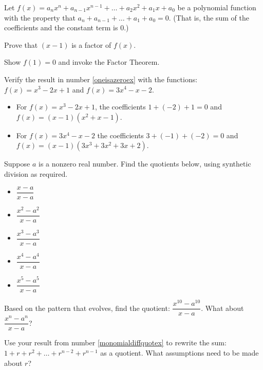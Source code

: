 \documentclass{ximera}
\begin{document}
\begin{problem}\label{oneisazeroex}
Let $f(x) = a_{n} x^{n} + a_{n-1} x^{n-1} + \ldots + a_{2} x^{2} + a_{1} x + a_{0}$ be a polynomial function with the property that $ a_{n}+a_{n-1} + \ldots + a_{1} + a_{0} = 0$.  (That is, the sum of the coefficients and the constant term is $0$.)  

Prove that $(x-1)$ is a factor of $f(x)$.

\begin{hint}
Show $f(1) = 0$ and invoke the Factor Theorem.
\end{hint}
\end{problem}

\begin{problem}
Verify the result in number \ref{oneisazeroex} with the functions: $f(x) = x^3 - 2x + 1$ and  $f(x) = 3x^4-x-2$.

\begin{solution}
\begin{itemize}

\item For $f(x) = x^3 - 2x + 1$, the coefficients $1+(-2) + 1 = 0$ and $f(x) = (x-1)(x^2+x-1)$.

\item  For $f(x) = 3x^4-x-2$ the coefficients $3+(-1)+(-2) = 0$ and $f(x) = (x-1)(3x^3+3x^2+3x+2)$.

\end{itemize}
\end{solution}
\end{problem}

\begin{problem}\label{monomialdiffquotex} 
Suppose $a$ is a nonzero real number.  Find the quotients below, using synthetic division as required. 

\begin{itemize}
    \item $\dfrac{x - a}{x-a}$
    \item $\dfrac{x^2 - a^2}{x-a}$ 
    \item $\dfrac{x^3 - a^3}{x-a}$ 
    \item $\dfrac{x^4 - a^4}{x-a}$ 
    \item $\dfrac{x^5 - a^5}{x-a}$ 
\end{itemize}

Based on the pattern that evolves, find the quotient: $\dfrac{x^{10} - a^{10}}{x-a}$.  What about  $\dfrac{x^{n} - a^{n}}{x-a}$?
\end{problem}

\begin{problem}\label{geoseriespreview}
Use your result from number \ref{monomialdiffquotex} to rewrite the sum: $1 + r + r^2 + \dots + r^{n-2} + r^{n-1}$ as a quotient. What assumptions need to be made about $r$?
\end{problem}
\end{document}
